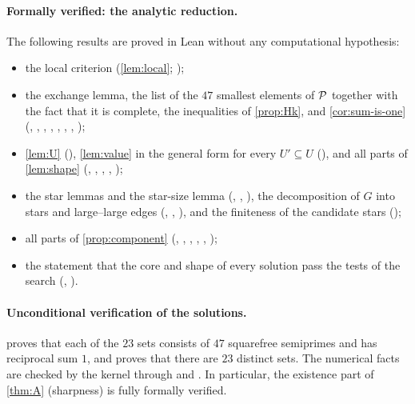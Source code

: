\documentclass[11pt]{article}
\begin{document}
\paragraph{Formally verified: the analytic reduction.}
The following results are proved in Lean without any computational hypothesis:
\begin{itemize}
\item the local criterion (\cref{lem:local}; );
\item the exchange lemma, the list of the $47$ smallest elements of $\mathcal{P}$ together with the fact that it is complete, the inequalities of \cref{prop:Hk}, and \cref{cor:sum-is-one} (, , , , , , , );
\item \cref{lem:U} (), \cref{lem:value} in the general form for every $U'\subseteq U$ (), and all parts of \cref{lem:shape} (, , , , );
\item the star lemmas and the star-size lemma (, , ), the decomposition of $G$ into stars and large--large edges (, , ), and the finiteness of the candidate stars ();
\item all parts of \cref{prop:component} (, , , , , );
\item the statement that the core and shape of every solution pass the tests of the search (, ).
\end{itemize}

\paragraph{Unconditional verification of the solutions.}
 proves that each of the $23$ sets consists of $47$ squarefree semiprimes and has reciprocal sum $1$, and  proves that there are $23$ distinct sets.
The numerical facts are checked by the kernel through  and .
In particular, the existence part of \cref{thm:A} (sharpness) is fully formally verified.
\end{document}
